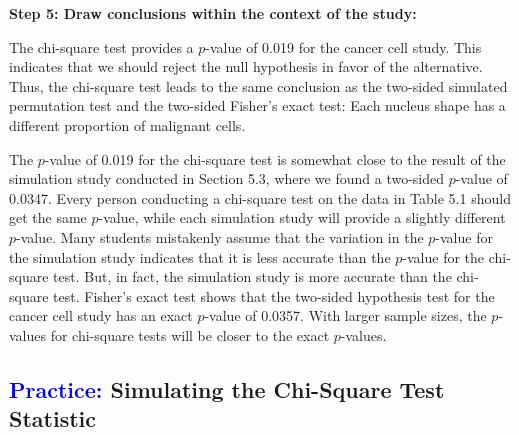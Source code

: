 \documentclass[
]{report}
\begin{document}
\textbf{Step 5: Draw conclusions within the context of the study:}

The chi-square test provides a \(\scriptstyle p\)-value of 0.019 for the cancer cell study. This indicates that we should reject the null hypothesis in favor of the alternative. Thus, the chi-square test leads to the same conclusion as the two-sided simulated permutation test and the two-sided Fisher's exact test: Each nucleus shape has a different proportion of malignant cells.

The \(\scriptstyle p\)-value of 0.019 for the chi-square test is somewhat close to the result of the simulation study conducted in Section 5.3, where we found a two-sided \(\scriptstyle p\)-value of 0.0347. Every person conducting a chi-square test on the data in Table 5.1 should get the same \(\scriptstyle p\)-value, while each simulation study will provide a slightly different \(\scriptstyle p\)-value. Many students mistakenly assume that the variation in the \(\scriptstyle p\)-value for the simulation study indicates that it is less accurate than the \(\scriptstyle p\)-value for the chi-square test. But, in fact, the simulation study is more accurate than the chi-square test. Fisher's exact test shows that the two-sided hypothesis test for the cancer cell study has an exact \(\scriptstyle p\)-value of 0.0357. With larger sample sizes, the \(\scriptstyle p\)-values for chi-square tests will be closer to the exact \(\scriptstyle p\)-values.

\hypertarget{simulating-the-chi-square-test-statistic}{%
\subsection*{\texorpdfstring{\textcolor{blue}{Practice:} Simulating the Chi-Square Test Statistic}{ Simulating the Chi-Square Test Statistic}}\label{simulating-the-chi-square-test-statistic}}
\end{document}
